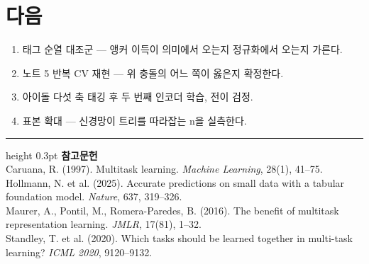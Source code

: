 \documentclass[10pt]{article}
\begin{document}
\section{다음}

\begin{enumerate}[leftmargin=1.3em,itemsep=0.15em]
\item 태그 순열 대조군 --- 앵커 이득이 의미에서 오는지 정규화에서 오는지 가른다.
\item 노트 5 반복 CV 재현 --- 위 충돌의 어느 쪽이 옳은지 확정한다.
\item 아이돌 다섯 축 태깅 후 두 번째 인코더 학습, 전이 검정.
\item 표본 확대 --- 신경망이 트리를 따라잡는 n을 실측한다.
\end{enumerate}

\vspace{0.6em}
\hrule height 0.3pt
\vspace{0.5em}
{\footnotesize
\textbf{참고문헌}\\[0.3em]
Caruana, R. (1997). Multitask learning. \emph{Machine Learning}, 28(1), 41--75.\\[0.15em]
Hollmann, N. et al. (2025). Accurate predictions on small data with a tabular
foundation model. \emph{Nature}, 637, 319--326.\\[0.15em]
Maurer, A., Pontil, M., Romera-Paredes, B. (2016). The benefit of multitask
representation learning. \emph{JMLR}, 17(81), 1--32.\\[0.15em]
Standley, T. et al. (2020). Which tasks should be learned together in multi-task
learning? \emph{ICML 2020}, 9120--9132.
}
\end{document}
